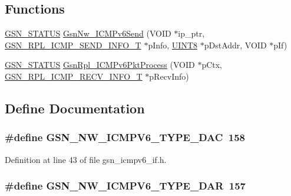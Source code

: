 \subsection*{Functions}
\begin{DoxyCompactItemize}
\item 
\hyperlink{a00660_gada5951904ac6110b1fa95e51a9ddc217}{GSN\_\-STATUS} \hyperlink{a00517_ae1499751f3ce2b87c7cff0660c82f310}{GsnNw\_\-ICMPv6Send} (VOID $\ast$ip\_\-ptr, \hyperlink{a00202}{GSN\_\-RPL\_\-ICMP\_\-SEND\_\-INFO\_\-T} $\ast$pInfo, \hyperlink{a00660_gab27e9918b538ce9d8ca692479b375b6a}{UINT8} $\ast$pDstAddr, VOID $\ast$pIf)
\item 
\hyperlink{a00660_gada5951904ac6110b1fa95e51a9ddc217}{GSN\_\-STATUS} \hyperlink{a00517_a8c4d4e5c8fb9eeadc329b71328f98c8a}{GsnRpl\_\-ICMPv6PktProcess} (VOID $\ast$pCtx, \hyperlink{a00201}{GSN\_\-RPL\_\-ICMP\_\-RECV\_\-INFO\_\-T} $\ast$pRecvInfo)
\end{DoxyCompactItemize}


\subsection{Define Documentation}
\hypertarget{a00517_a6fe0f507c619484e4329d0ca0874c676}{
\subsubsection[{GSN\_\-NW\_\-ICMPV6\_\-TYPE\_\-DAC}]{\setlength{\rightskip}{0pt plus 5cm}\#define GSN\_\-NW\_\-ICMPV6\_\-TYPE\_\-DAC~158}}
\label{a00517_a6fe0f507c619484e4329d0ca0874c676}


Definition at line 43 of file gsn\_\-icmpv6\_\-if.h.

\hypertarget{a00517_a940c791f30b90f1694c39ef73afed3c6}{
\subsubsection[{GSN\_\-NW\_\-ICMPV6\_\-TYPE\_\-DAR}]{\setlength{\rightskip}{0pt plus 5cm}\#define GSN\_\-NW\_\-ICMPV6\_\-TYPE\_\-DAR~157}}
\label{a00517_a940c791f30b90f1694c39ef73afed3c6}



